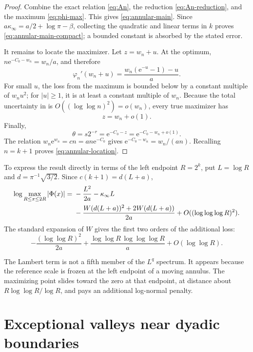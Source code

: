 \documentclass[11pt,oneside]{article}
\numberwithin{equation}{section}
\theoremstyle{definition}
\theoremstyle{remark}
\newcommand{\e}{\mathrm e}
\newcommand{\abs}[1]{\left|#1\right|}
\newcommand{\PhiUp}{\Phi}
\newcommand{\LambertW}{W}
\begin{document}
\begin{proof}
Combine the exact relation \eqref{eq:An}, the reduction
\eqref{eq:An-reduction}, and the maximum \eqref{eq:phi-max}.  This gives
\eqref{eq:annular-main}.  Since
\(a\kappa_\infty=a/2+\log\pi-\beta\), collecting the quadratic and linear terms in \(k\)
proves \eqref{eq:annular-main-compact}; a bounded constant is absorbed by the stated error.

It remains to locate the maximizer.  Let \(z=w_n+u\).  At the optimum,
\(n\e^{-C_0-w_n}=w_n/a\), and therefore
\[
 \varphi_n'(w_n+u)
 =\frac{w_n(\e^{-u}-1)-u}{a}.
\]
For small \(u\), the loss from the maximum is bounded below by a constant multiple of
\(w_nu^2\); for \(|u|\ge1\), it is at least a constant multiple of \(w_n\).
Because the total uncertainty in  is
\(O((\log\log n)^2)=o(w_n)\), every true maximizer has
\[
 z=w_n+o(1).
\]
Finally,
\[
 \theta=s2^{-r}=\e^{-C_0-z}
 =\e^{-C_0-w_n+o(1)}.
\]
The relation \(w_n\e^{w_n}=cn=an\e^{-C_0}\) gives
\(\e^{-C_0-w_n}=w_n/(an)\).  Recalling \(n=k+1\) proves
\eqref{eq:annular-location}.
\end{proof}

To express the result directly in terms of the left endpoint \(R=2^k\), put
\(L=\log R\) and \(d=\pi^{-1}\sqrt{3/2}\).  Since
\(c(k+1)=d(L+a)\),
\begin{align}
 \log\max_{R\le x\le2R}\abs{\PhiUp(x)}
 ={}&-\frac{L^2}{2a}-\kappa_\infty L\notag\\
 &-\frac{\LambertW(d(L+a))^2+2\LambertW(d(L+a))}{2a}
 +O((\log\log\log R)^2).
 \label{eq:annular-physical}
\end{align}
The standard expansion of \(\LambertW\) gives the first two orders of the additional loss:
\begin{equation}
 -\frac{(\log\log R)^2}{2a}
 +\frac{\log\log R\,\log\log\log R}{a}
 +O(\log\log R).
 \label{eq:second-lognormal}
\end{equation}

\begin{meaningbox}
The Lambert term is not a fifth member of the \(L^q\) spectrum.  It appears because the
reference scale is frozen at the left endpoint of a moving annulus.  The maximizing point
slides toward the zero at that endpoint, at distance about
\(R\log\log R/\log R\), and pays an additional log-normal penalty.
\end{meaningbox}

\section{Exceptional valleys near dyadic boundaries}
\label{sec:valleys}
\end{document}
